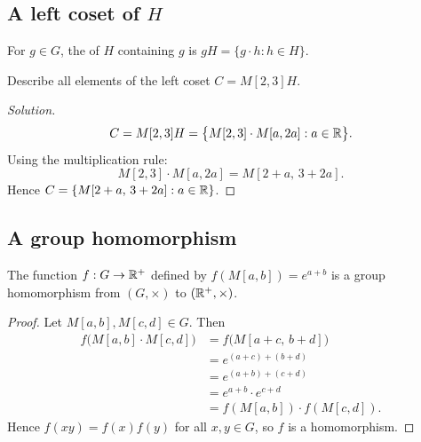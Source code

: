 \subsection{A left coset of \texorpdfstring{$H$}{H}}

\begin{definition}
For $g \in G$, the  of $H$ containing $g$ is
$gH = \{g \cdot h : h \in H\}$.
\end{definition}

\begin{example}
Describe all elements of the left coset $C = M[2,3]H$.
\end{example}

\begin{proof}[Solution]
\[
    C = M[2,3]H = \bigl\{M[2,3] \cdot M[a,2a] : a \in \mathbb{R}\bigr\}.
\]
Using the multiplication rule:
\[
    M[2,3] \cdot M[a,2a] = M[2+a,\, 3+2a].
\]
Hence $C = \{M[2+a,\, 3+2a] : a \in \mathbb{R}\}$.
\end{proof}

\subsection{A group homomorphism}

\begin{proposition}
The function $f : G \to \mathbb{R}^{+}$ defined by $f(M[a,b]) = e^{a+b}$ is a group
homomorphism from $(G, \times)$ to $(\mathbb{R}^{+}, \times)$.
\end{proposition}


\begin{proof}
Let $M[a,b], M[c,d] \in G$. Then
\begin{align*}
    f\bigl(M[a,b] \cdot M[c,d]\bigr)
    &= f\bigl(M[a+c,\, b+d]\bigr) \\
    &= e^{(a+c)+(b+d)} \\
    &= e^{(a+b)+(c+d)} \\
    &= e^{a+b} \cdot e^{c+d} \\
    &= f(M[a,b]) \cdot f(M[c,d]).
\end{align*}
Hence $f(xy) = f(x)f(y)$ for all $x, y \in G$, so $f$ is a homomorphism.
\end{proof}

